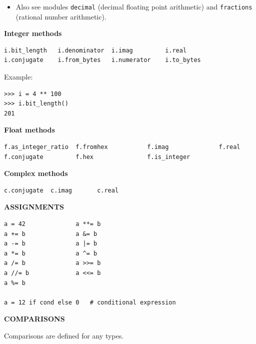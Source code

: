 \documentclass[9pt,a4wide]{extarticle}
\begin{document}
\begin{itemize}
\item Also see modules {\tt decimal} (decimal floating point arithmetic) and
   {\tt fractions} (rational number arithmetic).
\end{itemize}


\bigskip
{\LARGE\bf Integer methods}
{}

\begin{verbatim}
i.bit_length   i.denominator  i.imag         i.real         
i.conjugate    i.from_bytes   i.numerator    i.to_bytes    
\end{verbatim}

Example:

\begin{verbatim}
>>> i = 4 ** 100
>>> i.bit_length()
201
\end{verbatim}


\bigskip
{\LARGE\bf Float methods}
{}

\begin{verbatim}
f.as_integer_ratio  f.fromhex           f.imag              f.real              
f.conjugate         f.hex               f.is_integer        
\end{verbatim}



\bigskip
{\LARGE\bf Complex methods}
{}

\begin{verbatim}
c.conjugate  c.imag       c.real
\end{verbatim}




\bigskip
{\LARGE\bf ASSIGNMENTS}
{}


\begin{verbatim}
a = 42              a **= b  
a += b              a &= b
a -= b              a |= b
a *= b              a ^= b
a /= b              a >>= b
a //= b             a <<= b
a %= b

a = 12 if cond else 0   # conditional expression
\end{verbatim}




\bigskip
{\LARGE\bf COMPARISONS}
{}

\medskip

Comparisons are defined for any types.
\end{document}
